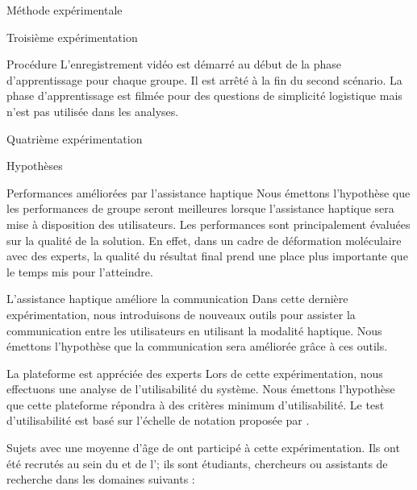 \documentclass[myfrancais,ngerman,english,frenchb]{mythesis}
\begin{document}
\begin{mychapter}{Méthode expérimentale}
\begin{mysection}{Troisième expérimentation}
\begin{mysubsection}{Procédure}
				L'enregistrement vidéo est démarré au début de la phase d'apprentissage pour chaque groupe.
				Il est arrêté à la fin du second scénario.
				La phase d'apprentissage est filmée pour des questions de simplicité logistique mais n'est pas utilisée dans les analyses.
			\end{mysubsection}
		\end{mysection}
		\begin{mysection}{Quatrième expérimentation}
			\begin{mysubsection}{Hypothèses}
				\begin{myparagraph}{ Performances améliorées par l'assistance haptique}
					Nous émettons l'hypothèse que les performances de groupe seront meilleures lorsque l'assistance haptique sera mise à disposition des utilisateurs.
					Les performances sont principalement évaluées sur la qualité de la solution.
					En effet, dans un cadre de déformation moléculaire avec des experts, la qualité du résultat final prend une place plus importante que le temps mis pour l'atteindre.
				\end{myparagraph}
				\begin{myparagraph}{ L'assistance haptique améliore la communication}
					Dans cette dernière expérimentation, nous introduisons de nouveaux outils pour assister la communication entre les utilisateurs en utilisant la modalité haptique.
					Nous émettons l'hypothèse que la communication sera améliorée grâce à ces outils.
				\end{myparagraph}
				\begin{myparagraph}{ La plateforme est appréciée des experts}
					Lors de cette expérimentation, nous effectuons une analyse de l'utilisabilité du système.
					Nous émettons l'hypothèse que cette plateforme répondra à des critères minimum d'utilisabilité.
					Le test d'utilisabilité est basé sur l'échelle de notation proposée par .
				\end{myparagraph}
			\end{mysubsection}
			\begin{mysubsection}{Sujets}
				 avec une moyenne d'âge de  ont participé à cette expérimentation.
				Ils ont été recrutés au sein du \myCNRSLIMSI et de l'; ils sont étudiants, chercheurs ou assistants de recherche dans les domaines suivants :

\end{mysubsection}
\end{mysection}
\end{mychapter}
\end{document}
